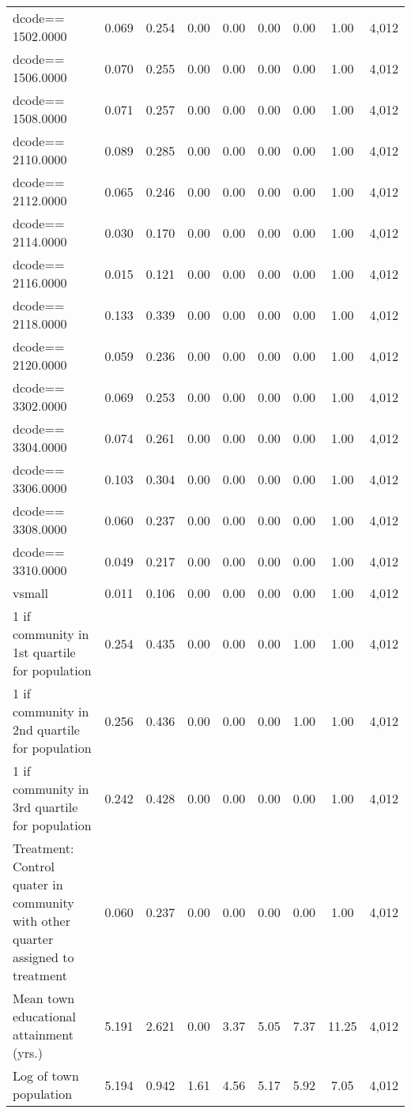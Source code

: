 \begin{tabular}{lcccccccc}
dcode==  1502.0000 & 0.069 & 0.254 & 0.00 & 0.00 & 0.00 & 0.00 & 1.00 & 4,012\\
dcode==  1506.0000 & 0.070 & 0.255 & 0.00 & 0.00 & 0.00 & 0.00 & 1.00 & 4,012\\
dcode==  1508.0000 & 0.071 & 0.257 & 0.00 & 0.00 & 0.00 & 0.00 & 1.00 & 4,012\\
dcode==  2110.0000 & 0.089 & 0.285 & 0.00 & 0.00 & 0.00 & 0.00 & 1.00 & 4,012\\
dcode==  2112.0000 & 0.065 & 0.246 & 0.00 & 0.00 & 0.00 & 0.00 & 1.00 & 4,012\\
dcode==  2114.0000 & 0.030 & 0.170 & 0.00 & 0.00 & 0.00 & 0.00 & 1.00 & 4,012\\
dcode==  2116.0000 & 0.015 & 0.121 & 0.00 & 0.00 & 0.00 & 0.00 & 1.00 & 4,012\\
dcode==  2118.0000 & 0.133 & 0.339 & 0.00 & 0.00 & 0.00 & 0.00 & 1.00 & 4,012\\
dcode==  2120.0000 & 0.059 & 0.236 & 0.00 & 0.00 & 0.00 & 0.00 & 1.00 & 4,012\\
dcode==  3302.0000 & 0.069 & 0.253 & 0.00 & 0.00 & 0.00 & 0.00 & 1.00 & 4,012\\
dcode==  3304.0000 & 0.074 & 0.261 & 0.00 & 0.00 & 0.00 & 0.00 & 1.00 & 4,012\\
dcode==  3306.0000 & 0.103 & 0.304 & 0.00 & 0.00 & 0.00 & 0.00 & 1.00 & 4,012\\
dcode==  3308.0000 & 0.060 & 0.237 & 0.00 & 0.00 & 0.00 & 0.00 & 1.00 & 4,012\\
dcode==  3310.0000 & 0.049 & 0.217 & 0.00 & 0.00 & 0.00 & 0.00 & 1.00 & 4,012\\
vsmall & 0.011 & 0.106 & 0.00 & 0.00 & 0.00 & 0.00 & 1.00 & 4,012\\
1 if community in 1st quartile for population & 0.254 & 0.435 & 0.00 & 0.00 & 0.00 & 1.00 & 1.00 & 4,012\\
1 if community in 2nd quartile for population & 0.256 & 0.436 & 0.00 & 0.00 & 0.00 & 1.00 & 1.00 & 4,012\\
1 if community in 3rd quartile for population & 0.242 & 0.428 & 0.00 & 0.00 & 0.00 & 0.00 & 1.00 & 4,012\\
Treatment: Control quater in community with other quarter assigned to treatment  & 0.060 & 0.237 & 0.00 & 0.00 & 0.00 & 0.00 & 1.00 & 4,012\\
Mean town educational attainment (yrs.) & 5.191 & 2.621 & 0.00 & 3.37 & 5.05 & 7.37 & 11.25 & 4,012\\
Log of town population & 5.194 & 0.942 & 1.61 & 4.56 & 5.17 & 5.92 & 7.05 & 4,012\\

\end{tabular}
